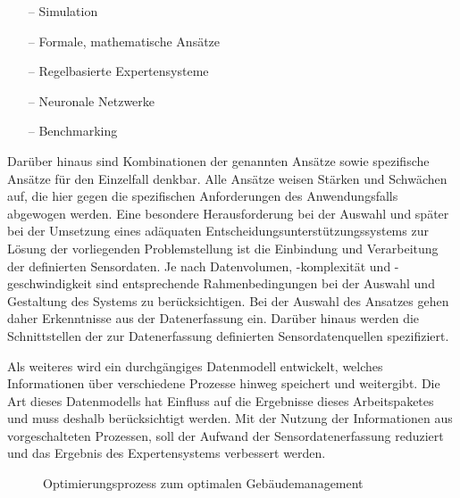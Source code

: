 \begin{itemize}
    \itemsep0em
    \item[--] Simulation
    \item[--] Formale, mathematische Ansätze
    \item[--] Regelbasierte Expertensysteme
    \item[--] Neuronale Netzwerke
    \item[--] Benchmarking
\end{itemize}

Darüber hinaus sind Kombinationen der genannten Ansätze sowie spezifische Ansätze für den Einzelfall denkbar. Alle Ansätze weisen Stärken und Schwächen auf, die hier gegen die spezifischen Anforderungen des Anwendungsfalls abgewogen werden. Eine besondere Herausforderung bei der Auswahl und später bei der Umsetzung eines adäquaten Entscheidungsunterstützungssystems zur Lösung der vorliegenden Problemstellung ist die Einbindung und Verarbeitung der definierten Sensordaten. Je nach Datenvolumen, -komplexität und -geschwindigkeit sind entsprechende Rahmenbedingungen bei der Auswahl und Gestaltung des Systems zu berücksichtigen. Bei der Auswahl des Ansatzes gehen daher Erkenntnisse aus der Datenerfassung ein. Darüber hinaus werden die Schnittstellen der zur Datenerfassung definierten Sensordatenquellen spezifiziert.

Als weiteres wird ein durchgängiges Datenmodell entwickelt, welches Informationen über verschiedene Prozesse hinweg speichert und weitergibt. Die Art dieses Datenmodells hat Einfluss auf die Ergebnisse dieses Arbeitspaketes und muss deshalb berücksichtigt werden. Mit der Nutzung der Informationen aus vorgeschalteten Prozessen, soll der Aufwand der Sensordatenerfassung reduziert und das Ergebnis des Expertensystems verbessert werden.

\begin{figure}[htbp]
    \centering
    \caption{\label{fig-opti}Optimierungsprozess zum optimalen Gebäudemanagement}
\end{figure}

